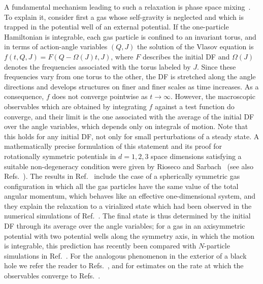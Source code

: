 A fundamental mechanism leading to such a relaxation is phase space mixing~\cite{dL62,dL67}. To explain it, consider first a gas whose self-gravity is neglected and which is trapped in the potential well of an external potential. If the one-particle Hamiltonian is integrable, each gas particle is confined to an invariant torus, and in terms of action-angle variables $(Q,J)$ the solution of the Vlasov equation is $f(t,Q,J) = F(Q - \Omega(J)t,J)$, where $F$ describes the initial DF and $\Omega(J)$ denotes the frequencies associated with the torus labeled by $J$. Since these frequencies vary from one torus to the other, the DF is stretched along the angle directions and develops structures on finer and finer scales as time increases. As a consequence, $f$ does not converge pointwise as $t\to\infty$. However, the macroscopic observables which are obtained by integrating $f$ against a test function do converge, and their limit is the one associated with the average of the initial DF over the angle variables, which depends only on integrals of motion. Note that this holds for any initial DF, not only for small perturbations of a steady state. A mathematically precise formulation of this statement and its proof for rotationally symmetric potentials in $d = 1,2,3$ space dimensions satisfying a suitable non-degeneracy condition were given by Rioseco and Sarbach~\cite{pRoS20} (see also Refs.~\cite{sTmHdL86,cM19}). The results in Ref.~\cite{pRoS20} include the case of a spherically symmetric gas configuration in which all the gas particles have the same value of the total angular momentum, which behaves like an effective one-dimensional system, and they explain the relaxation to a virialized state which had been observed in the numerical simulations of Ref.~\cite{pDeJmAeMdN17}. The final state is thus determined by the initial DF through its average over the angle variables; for a gas in an axisymmetric potential with two potential wells along the symmetry axis, in which the motion is integrable, this prediction has recently been compared with $N$-particle simulations in Ref.~\cite{aGPmGdNoS26}. For the analogous phenomenon in the exterior of a black hole we refer the reader to Refs.~\cite{pRoS18,pRoS24}, and for estimates on the rate at which the observables converge to Refs.~\cite{mMpRhV22,sCjL22,mHgRmScS24}.

